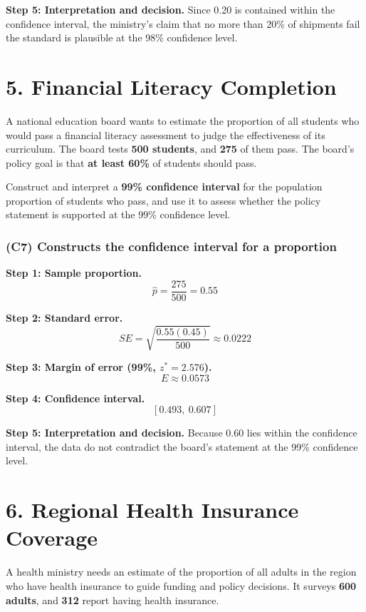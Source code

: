 	\textbf{Step 5: Interpretation and decision.}
	Since 0.20 is contained within the confidence interval, the ministry’s claim that no more than 20\% of shipments fail the standard is plausible at the 98\% confidence level.
	
\section*{5. Financial Literacy Completion}

A national education board wants to estimate the proportion of all students who would pass a financial literacy assessment to judge the effectiveness of its curriculum. The board tests \textbf{500 students}, and \textbf{275} of them pass. The board’s policy goal is that \textbf{at least 60\%} of students should pass.

Construct and interpret a \textbf{99\% confidence interval} for the population proportion of students who pass, and use it to assess whether the policy statement is supported at the 99\% confidence level.
	
	\subsubsection*{(C7) Constructs the confidence interval for a proportion}
	
	\textbf{Step 1: Sample proportion.}
	\[
	\hat{p} = \frac{275}{500} = 0.55
	\]
	
	\textbf{Step 2: Standard error.}
	\[
	SE = \sqrt{\frac{0.55(0.45)}{500}} \approx 0.0222
	\]
	
	\textbf{Step 3: Margin of error (99\%, \(z^* = 2.576\)).}
	\[
	E \approx 0.0573
	\]
	
	\textbf{Step 4: Confidence interval.}
	\[
	[0.493,\ 0.607]
	\]
	
	\textbf{Step 5: Interpretation and decision.}
	Because 0.60 lies within the confidence interval, the data do not contradict the board’s statement at the 99\% confidence level.
	
\section*{6. Regional Health Insurance Coverage}

A health ministry needs an estimate of the proportion of all adults in the region who have health insurance to guide funding and policy decisions. It surveys \textbf{600 adults}, and \textbf{312} report having health insurance.

